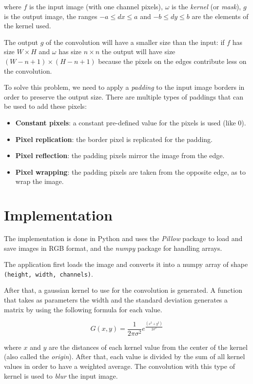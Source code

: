 \documentclass[10pt,twocolumn,letterpaper]{article}
\begin{document}
where $f$ is the input image (with one channel pixels), $\omega$ is the \textit{kernel} (or \textit{mask}), $g$ is the output image, the ranges $-a \leq dx \leq a$ and $-b \leq dy \leq b$ are the elements of the kernel used.

The output $g$ of the convolution will have a smaller size than the input: if $f$ has size $W \times H$ and $\omega$ has size $n \times n$ the output will have size $(W - n + 1) \times (H - n + 1)$ because the pixels on the edges contribute less on the convolution. 

To solve this problem, we need to apply a \textit{padding} to the input image borders in order to preserve the output size. There are multiple types of paddings that can be used to add these pixels: 

\begin{itemize}
	\item \textbf{Constant pixels}: a constant pre-defined value for the pixels is used (like 0).
	\item \textbf{Pixel replication}: the border pixel is replicated for the padding.
	\item \textbf{Pixel reflection}: the padding pixels mirror the image from the edge.
	\item \textbf{Pixel wrapping}: the padding pixels are taken from the opposite edge, as to wrap the image.
\end{itemize} 

\section{Implementation}

The implementation is done in Python and uses the \textit{Pillow} package to load and save images in RGB format, and the \textit{numpy} package for handling arrays. 

The application first loads the image and converts it into a numpy array of shape \verb"(height, width, channels)".

After that, a gaussian kernel to use for the convolution is generated. A function that takes as parameters the width and the standard deviation generates a matrix by using the following formula for each value.

\[G(x, y) = \frac{1}{2\pi\sigma^2}e^{\frac{(x^2 + y^2)}{2\sigma^2}}\]

where $x$ and $y$ are the distances of each kernel value from the center of the kernel (also called the \textit{origin}). After that, each value is divided by the sum of all kernel values in order to have a weighted average.
The convolution with this type of kernel is used to \textit{blur} the input image.
\end{document}

